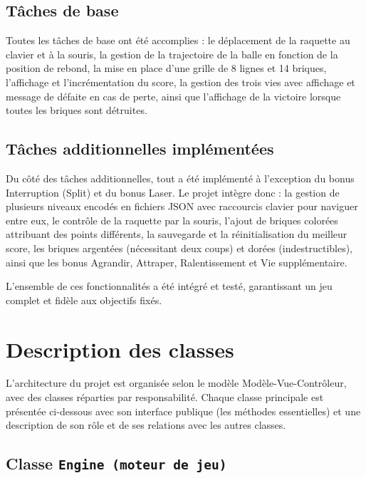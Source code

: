 \documentclass[12pt]{article}
\begin{document}
\subsection{Tâches de base}

Toutes les tâches de base ont été accomplies : le déplacement de la raquette au clavier et à la souris, la gestion de la trajectoire de la balle en fonction de la position de rebond, la mise en place d’une grille de 8 lignes et 14 briques, l’affichage et l’incrémentation du score, la gestion des trois vies avec affichage et message de défaite en cas de perte, ainsi que l’affichage de la victoire lorsque toutes les briques sont détruites.

\subsection{Tâches additionnelles implémentées}

Du côté des tâches additionnelles, tout a été implémenté à l’exception du bonus Interruption (Split) et du bonus Laser. Le projet intègre donc : la gestion de plusieurs niveaux encodés en fichiers JSON avec raccourcis clavier pour naviguer entre eux, le contrôle de la raquette par la souris, l’ajout de briques colorées attribuant des points différents, la sauvegarde et la réinitialisation du meilleur score, les briques argentées (nécessitant deux coups) et dorées (indestructibles), ainsi que les bonus Agrandir, Attraper, Ralentissement et Vie supplémentaire.

L’ensemble de ces fonctionnalités a été intégré et testé, garantissant un jeu complet et fidèle aux objectifs fixés.



\section{Description des classes}
L’architecture du projet est organisée selon le modèle Modèle-Vue-Contrôleur, avec des classes réparties par responsabilité. Chaque classe principale est présentée ci-dessous avec son interface publique (les méthodes essentielles) et une description de son rôle et de ses relations avec les autres classes.

\subsection{Classe \texttt{Engine (moteur de jeu)}}
\end{document}
